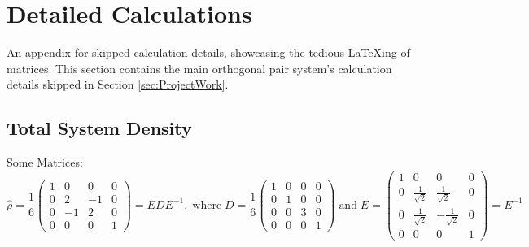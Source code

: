 \section{Detailed Calculations}
\label{sec:DetailedCalculations}

An appendix for skipped calculation details, showcasing the tedious LaTeXing of matrices.
This section contains the main orthogonal pair system's calculation details skipped in Section \ref{sec:ProjectWork}.



\subsection{Total System Density}
\label{sec:SubTotSymDens}

Some Matrices:
\begin{equation}\label{eq:Diagonalisation}
    \hat{\rho} =    \frac{1}{6}
                    \begin{pmatrix}
                        1 &  0 &  0 & 0 \\
                        0 &  2 & -1 & 0 \\
                        0 & -1 &  2 & 0 \\
                        0 &  0 &  0 & 1
                    \end{pmatrix}
               =    EDE^{-1}, \; \text{where} \;
    D = \frac{1}{6}
        \begin{pmatrix}
            1 & 0 & 0 & 0 \\
            0 & 1 & 0 & 0 \\
            0 & 0 & 3 & 0 \\
            0 & 0 & 0 & 1
        \end{pmatrix} \; \text{and} \;
    E = \begin{pmatrix}
            1 &  0 &  0 & 0 \\
            0 & \frac{1}{\sqrt{2}} &  \frac{1}{\sqrt{2}} & 0 \\
            0 & \frac{1}{\sqrt{2}} & -\frac{1}{\sqrt{2}} & 0 \\
            0 &  0 &  0 & 1
        \end{pmatrix} = E^{-1}
\end{equation}


